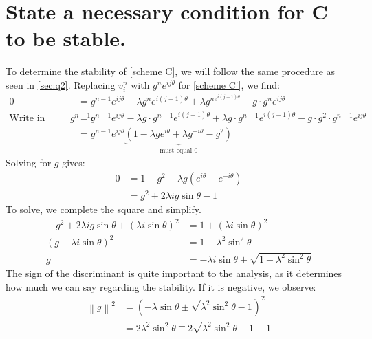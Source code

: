 \documentclass{hw_report}
\begin{document}
    \section{{State a necessary condition for \textbf{C} to be stable.}} \label{sec:q3}
    To determine the stability of \cref{scheme C}, we will follow the same procedure as seen in \cref{sec:q2}.
    Replacing $v_i^n$ with $g^n e^{ij\theta}$ for \cref{scheme C'}, we find:
    \begin{equation*}
        \begin{split}
            0&= g^{n-1}e^{ij\theta} -\lambda g^n e^{i(j+1)\theta}+\lambda g^{ne^{i(j-1)\theta}}-g\cdot g^n e^{ij\theta} \\
            \text{Write in terms of $g^{n-1}$:} \quad &=g^{n-1}e^{ij\theta} -\lambda g\cdot g^{n-1} e^{i(j+1)\theta}+\lambda g\cdot g^{n-1}e^{i(j-1)\theta}-g\cdot g^2 \cdot g^{n-1} e^{ij\theta}\\
            &= g^{n-1}e^{ij\theta}\underbrace{\left( 1-\lambda ge^{i\theta}+\lambda g^{-i\theta}-g^2 \right)}_{\text{must equal 0}}
        \end{split}
    \end{equation*}
    Solving for $g$ gives:
    \begin{equation*}
        \begin{split}
            0 &=1-g^2-\lambda g\left( e^{i\theta}-e^{-i\theta} \right) \\
            &=g^2 + 2\lambda ig\sin \theta -1
        \end{split}
    \end{equation*}
    To solve, we complete the square and simplify.
    \begin{equation*}
        \begin{split}
            \quad g^2 + 2\lambda ig\sin \theta +\left( \lambda i\sin \theta \right)^2 &= 1+ \left( \lambda i\sin \theta \right)^2 \\
            \left( g+\lambda i\sin \theta \right)^2 &= 1-\lambda^2\sin ^2 \theta \\
            g &= -\lambda i\sin \theta \pm \sqrt {1-\lambda^2 \sin^2 \theta }
        \end{split}
    \end{equation*}
    The sign of the discriminant is quite important to the analysis, as it determines how much we can say regarding the stability.
    If it is negative, we observe:
    \begin{equation*}
        \begin{split}
            \left\| g \right\|^2 &= \left( -\lambda\sin \theta \pm \sqrt {\lambda^2\sin ^2 \theta -1} \right)^2 \\
            &= 2\lambda^2 \sin ^2\theta \mp 2\sqrt {\lambda^2 \sin^2 \theta -1} -1
        \end{split}
    \end{equation*}
\end{document}
